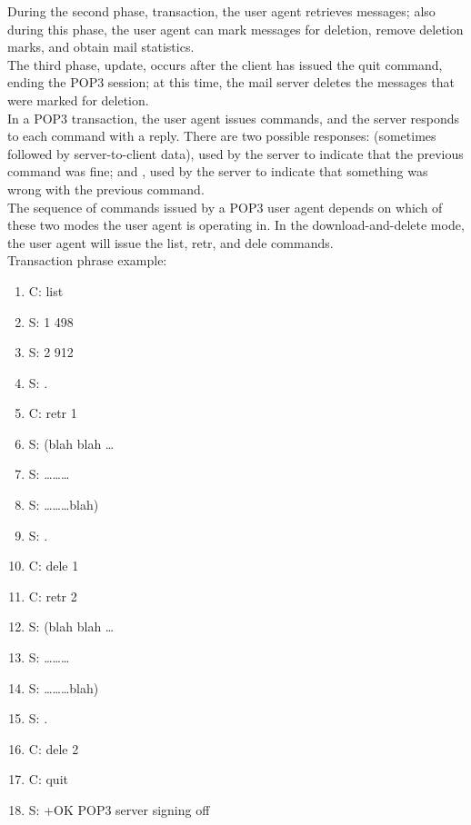 During the second phase, transaction, the user
agent retrieves messages; also during this phase, the user agent can mark messages
for deletion, remove deletion marks, and obtain mail statistics.\\

The third phase,
update, occurs after the client has issued the quit command, ending the POP3
session; at this time, the mail server deletes the messages that were marked for
deletion.\\

In a POP3 transaction, the user agent issues commands, and the server responds
to each command with a reply. There are two possible responses:  (sometimes
followed by server-to-client data), used by the server to indicate that the previous
command was fine; and , used by the server to indicate that something was
wrong with the previous command.\\

The sequence of commands issued by a POP3 user agent depends on which
of these two modes the user agent is operating in. In the download-and-delete mode,
the user agent will issue the list, retr, and dele commands.\\

Transaction phrase example:
\begin{enumerate}
    \item C: list
    \item S: 1 498
    \item S: 2 912
    \item S: .
    \item C: retr 1
    \item S: (blah blah \dots
    \item S: \dots \dots \dots
    \item S: \dots \dots \dots blah)
    \item S: .
    \item C: dele 1
    \item C: retr 2
    \item S: (blah blah \dots
    \item S: \dots \dots \dots
    \item S: \dots \dots \dots blah)
    \item S: .
    \item C: dele 2
    \item C: quit
    \item S: +OK POP3 server signing off
\end{enumerate}

